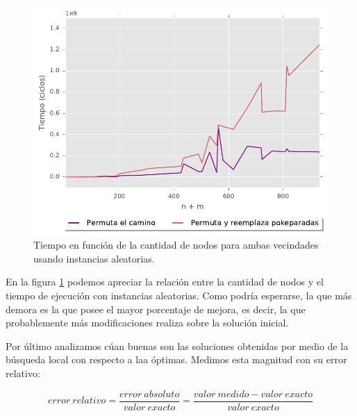 \begin{figure}[H]
  \begin{center}
    \includegraphics{../experimentacion/ej3/expAleat_cantNodos_tiempo.pdf}
    \caption{Tiempo en funci\'on de la cantidad de nodos para ambas vecindades usando instancias aleatorias.}
    \label{fig:ej3_expAleat_cantNodos_tiempo}
  \end{center}
\end{figure}

En la figura \ref{fig:ej3_expAleat_cantNodos_tiempo} podemos apreciar la relaci\'on entre la cantidad de nodos y el tiempo de ejecuci\'on con instancias aleatorias. Como podr\'ia esperarse, la que m\'as demora es la que posee el mayor porcentaje de mejora, es decir, la que probablemente m\'as modificaciones realiza sobre la soluci\'on inicial.

Por \'ultimo analizamos c\'uan buenas son las soluciones obtenidas por medio de la b\'usqueda local con respecto a laa \'optimas. Medimos esta magnitud con su error relativo:

\begin{equation*}
    error\ relativo = \frac{error\ absoluto}{valor\ exacto} = \frac{valor\ medido - valor\ exacto}{valor\ exacto}
\end{equation*}

